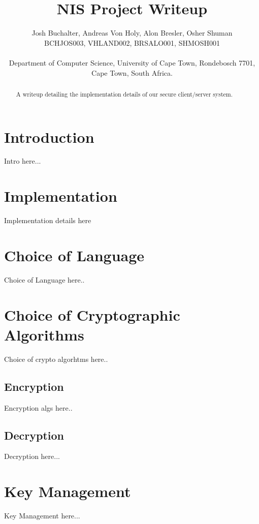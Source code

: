 \documentclass[a4paper,10pt]{article}
\title{\bf NIS Project Writeup}
\author{Josh Buchalter, Andreas Von Holy, Alon Bresler, Osher Shuman \\
BCHJOS003, VHLAND002, BRSALO001, SHMOSH001 \\\\
Department of Computer Science, University of Cape Town, Rondebosch 7701, \\Cape Town, South Africa.}
\begin{document}
\maketitle

\begin{abstract}
A writeup detailing the implementation details of our secure client/server system.
\end{abstract}

\section{Introduction}
Intro here...
\section{Implementation}
Implementation details here
\section{Choice of Language}
Choice of Language here..
\section{Choice of Cryptographic Algorithms}
Choice of crypto algorhtms here..
\subsection{Encryption}
Encryption algs here..

\subsection{Decryption}
Decryption here...
\section{Key Management}
Key Management here...
\end{document}
